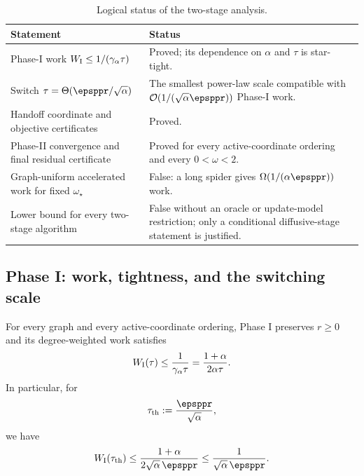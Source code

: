 \begin{table}[t]
\centering
\caption{Logical status of the two-stage analysis.}
\label{tab:cf-status}
\begin{tabularx}{\textwidth}{@{}lX@{}}
\toprule
Statement & Status \\
\midrule
Phase-I work \(W_{\rm I}\leq1/(\gamma_\alpha\tau)\)
    & Proved; its dependence on \(\alpha\) and \(\tau\) is star-tight. \\
Switch \(\tau=\Theta(\epsppr/\sqrt\alpha)\)
    & The smallest power-law scale compatible with
      \(\mathcal O(1/(\sqrt\alpha\epsppr))\) Phase-I work. \\
Handoff coordinate and objective certificates
    & Proved. \\
Phase-II convergence and final residual certificate
    & Proved for every active-coordinate ordering and every
      \(0<\omega<2\). \\
Graph-uniform accelerated work for fixed \(\omega_\star\)
    & False: a long spider gives
      \(\Omega(1/(\alpha\epsppr))\) work. \\
Lower bound for every two-stage algorithm
    & False without an oracle or update-model restriction; only a conditional
      diffusive-stage statement is justified. \\
\bottomrule
\end{tabularx}
\end{table}

\subsection{Phase I: work, tightness, and the switching scale}
\label{subsec:cf-phase-one}

\begin{proposition}
\label{prop:cf-phase-one-work}
For every graph and every active-coordinate ordering, Phase I preserves
\(r\geq0\) and its degree-weighted work satisfies
\begin{equation}
    W_{\rm I}(\tau)
    \leq\frac{1}{\gamma_\alpha\tau}
    =\frac{1+\alpha}{2\alpha\tau}.
    \label{eq:cf-phase-one-work}
\end{equation}
In particular, for
\begin{equation}
    \tau_{\rm th}:=\frac{\epsppr}{\sqrt\alpha},
    \label{eq:cf-theory-switch}
\end{equation}
we have
\begin{equation}
    W_{\rm I}(\tau_{\rm th})
    \leq
    \frac{1+\alpha}{2\sqrt\alpha\,\epsppr}
    \leq\frac{1}{\sqrt\alpha\,\epsppr}.
    \label{eq:cf-phase-one-target}
\end{equation}
\end{proposition}

